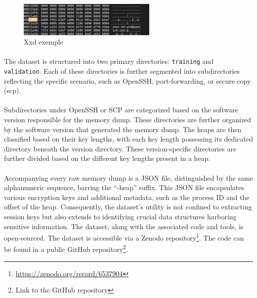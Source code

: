 {        \begin{figure}[H]
            \centering
            \includegraphics[width=0.6\textwidth]{img/background/xxd.png}
            \caption{Xxd exemple}
            \label{fig:Background:xxd}
        \end{figure}

        \paragraph{}The dataset is structured into two primary directories: \texttt{training} and \texttt{validation}. Each of these directories is further segmented into subdirectories reflecting the specific scenario, such as OpenSSH, port-forwarding, or secure copy (\acrshort{scp}).

        \paragraph{}Subdirectories under OpenSSH or SCP are categorized based on the software version responsible for the memory dump. These directories are further organized by the software version that generated the memory dump. The heaps are then classified based on their key lengths, with each key length possessing its dedicated directory beneath the version directory. These version-specific directories are further divided based on the different key lengths present in a heap.

        \paragraph{}Accompanying every raw memory dump is a JSON file, distinguished by the same alphanumeric sequence, barring the ``-heap'' suffix. This JSON file encapsulates various encryption keys and additional metadata, such as the process ID and the offset of the heap. Consequently, the dataset's utility is not confined to extracting session keys but also extends to identifying crucial data structures harboring sensitive information. The dataset, along with the associated code and tools, is open-sourced. The dataset is accessible via a Zenodo repository\footnote{\url{https://zenodo.org/record/6537904}}. The code can be found in a public GitHub repository\footnote{Link to the GitHub repository}.}
        
